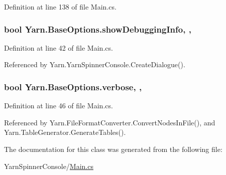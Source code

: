 Definition at line 138 of file Main.\-cs.

\hypertarget{a00041_a89964ea17bd19caf00cb5bff563ed01c}{
\subsubsection[{show\-Debugging\-Info}]{\setlength{\rightskip}{0pt plus 5cm}bool Yarn.\-Base\-Options.\-show\-Debugging\-Info\hspace{0.3cm}{\ttfamily [get]}, {\ttfamily [set]}, {\ttfamily [inherited]}}}\label{a00041_a89964ea17bd19caf00cb5bff563ed01c}


Definition at line 42 of file Main.\-cs.



Referenced by Yarn.\-Yarn\-Spinner\-Console.\-Create\-Dialogue().

\hypertarget{a00041_ada4d83d1756918f362d55f6649b82b17}{
\subsubsection[{verbose}]{\setlength{\rightskip}{0pt plus 5cm}bool Yarn.\-Base\-Options.\-verbose\hspace{0.3cm}{\ttfamily [get]}, {\ttfamily [set]}, {\ttfamily [inherited]}}}\label{a00041_ada4d83d1756918f362d55f6649b82b17}


Definition at line 46 of file Main.\-cs.



Referenced by Yarn.\-File\-Format\-Converter.\-Convert\-Nodes\-In\-File(), and Yarn.\-Table\-Generator.\-Generate\-Tables().



The documentation for this class was generated from the following file\-:\begin{DoxyCompactItemize}
\item 
Yarn\-Spinner\-Console/\hyperlink{a00325}{Main.\-cs}\end{DoxyCompactItemize}
